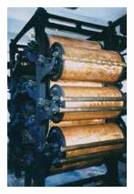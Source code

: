 \documentclass[fontsize=12pt, appendixprefix=true]{scrreprt}
\begin{document}
\begin{figure}[h!]
	\centering
	\begin{subfigure}[b]{0.2\linewidth}
	  \includegraphics[width=\linewidth]{img/mangorlo.jpg}
	  \caption{}
	\end{subfigure}
	\begin{subfigure}[b]{0.3\linewidth}

\end{subfigure}
\end{figure}
\end{document}

